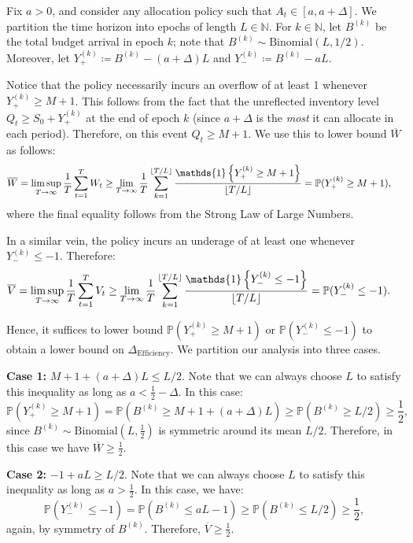 \documentclass[mnsc,nonblindrev]{informs3}
\newcommand{\pr}{\mathbb{P}}
\renewcommand{\Pr}{\pr}
\newcommand{\Ind}[1]{\mathds{1}\left\{ #1 \right\}}
\newcommand{\Deff}{\Delta_{\text{Efficiency}}\xspace}
\newcommand{\Yplusk}{Y_+^{(k)}}
\newcommand{\Yminusk}{Y_{-}^{(k)}}
\newcommand{\Bk}{B^{(k)}}
\DeclarePairedDelimiter{\floor}{\lfloor}{\rfloor}
\renewenvironment{proof}[1][Proof]{%
  \par\noindent{\itshape #1.} \ignorespaces
}{%
  \hfill\Halmos\par
}
\begin{document}
\begin{proof}
Fix $a > 0$, and consider any allocation policy such that $A_t \in [a, a+\Delta]$. %
We partition the time horizon into epochs of length $L \in \mathbb{N}$. For $k \in \mathbb{N}$, let $\Bk$ be the total budget arrival in epoch $k$; note that $\Bk\sim\text{Binomial}(L,1/2)$. Moreover, let $\Yplusk \coloneqq \Bk - (a+\Delta)L$ and $\Yminusk  \coloneqq  \Bk - aL$. 

Notice that the policy necessarily incurs an overflow of at least 1 whenever $\Yplusk \geq M+1$. This follows from the fact that the unreflected inventory level $Q_t \geq S_0 + \Yplusk$ at the end of epoch $k$ (since $a+\Delta$ is the {\it most} it can allocate in each period). 
Therefore, on this event $Q_t \geq M+1$. We use this to lower bound $\overline{W}$ as follows:
\begin{align*}
\label{eq:w_v_lower_bounds}
\overline{W} & = \limsup_{T \rightarrow \infty} \frac{1}{T} \sum_{t=1}^T W_t \geq \lim_{T \rightarrow \infty} \frac{1}{T} \sum_{k=1}^{\floor{T / L}} \frac{\Ind{\Yplusk \geq M+1}}{\floor{T/L}} = \Pr(\Yplusk \geq M+1),
\end{align*}
where the final equality follows from the Strong Law of Large Numbers.

In a similar vein, the policy incurs an underage of at least one whenever $\Yminusk \leq -1$. Therefore:
\begin{align*}
\overline{V} & = \limsup_{T \rightarrow \infty} \frac{1}{T} \sum_{t=1}^T V_t \geq \lim_{T \rightarrow \infty} \frac{1}{T} \sum_{k=1}^{\floor{T/L}} \frac{\Ind{\Yminusk \leq -1}}{\floor{T/L}} = \Pr(\Yminusk \leq -1).
\end{align*}

Hence, it suffices to lower bound $\Pr(\Yplusk \geq M+1)$ {or} $\Pr(\Yminusk \leq -1)$ {to obtain a lower bound on $\Deff$}. We partition our analysis into three cases.

\textbf{Case 1:} $M+1+(a+\Delta)L \leq L/2$. Note that we can always choose $L$ to satisfy this inequality as long as $a < \frac12-\Delta$. In this case:
\[
\Pr(\Yplusk \ge M{+}1)
= \Pr(\Bk \geq M+1 + (a + \Delta)L) \geq \Pr(\Bk \geq L/2) \geq \frac12,
\]
since $\Bk \sim \text{Binomial}(L, \tfrac12)$ is symmetric around its mean $L/2$. Therefore, in this case we have $\overline{W} \geq \frac12$.

\medskip
\textbf{Case 2:} $-1 + aL \geq L/2$. Note that we can always choose $L$ to satisfy this inequality as long as $a > \frac12$. In this case, we have:
\[
\Pr(\Yminusk \le -1) = \Pr(\Bk \leq aL - 1) \geq \Pr(\Bk \leq L/2) \geq \frac12,
\]
again, by symmetry of $\Bk$. Therefore, $\overline{V} \geq \frac{1}{2}$. 


\end{proof}
\end{document}
